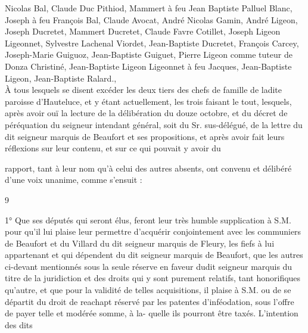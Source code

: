 \documentclass[a4paper,twoside,openany]{article}
\begin{document}

Nicolas Bal, 
Claude Duc Pithiod, 
Mammert à feu Jean Baptiste Palluel Blanc, 
Joseph à feu François Bal, 
Claude Avocat, 
André Nicolas Gamin, 
André Ligeon, 
Joseph Ducretet, 
Mammert Ducretet, 
Claude Favre Cotillet, 
Joseph Ligeon Ligeonnet, 
Sylvestre Lachenal Viordet, 
Jean-Baptiste Ducretet, 
François Carcey, 
Joseph-Marie Guiguoz, 
Jean-Baptiste Guiguet, 
Pierre Ligeon comme tuteur de Donza Christiné, 
Jean-Baptiste Ligeon Ligeonnet à feu Jacques, 
Jean-Baptiste Ligeon, 
Jean-Baptiste Ralard., 
\\
À tous lesquels se disent excéder les deux tiers des
chefs de famille de ladite paroisse d’Hauteluce,
et y étant actuellement, les trois faisant le tout,
lesquels, après avoir ouï la lecture de la délibération
du douze octobre, et du décret de péréquation du
seigneur intendant général, soit du Sr. sus-délégué,
de la lettre du dit seigneur marquis de Beaufort
et ses propositions, et après avoir fait leurs réflexions
sur leur contenu, et sur ce qui pouvait y avoir du 



rapport, tant à leur nom qu’à celui des autres
absents, ont convenu et délibéré d’une voix
unanime, comme s’ensuit :
\begin{center}
9
\end{center}
1° Que ses députés qui seront élus, feront leur
très humble supplication à S.M. pour qu’il lui
plaise leur permettre d’acquérir conjointement avec
les communiers de Beaufort et du Villard du dit
seigneur marquis de Fleury, les fiefs à lui appartenant
et qui dépendent du dit seigneur marquis
de Beaufort, que les autres ci-devant mentionnés
sous la seule réserve en faveur dudit seigneur marquis
du titre de la juridiction et des droits qui y sont
purement relatifs, tant honorifiques qu’autre,
et que pour la validité de telles acquisitions, il plaise
à S.M. ou de se départit du \gls{droit de reachapt}
réservé par les patentes d’inféodation, sous
l’offre de payer telle et modérée somme, à la-
quelle ils pourront être taxés. L’intention des dits
\end{document}
